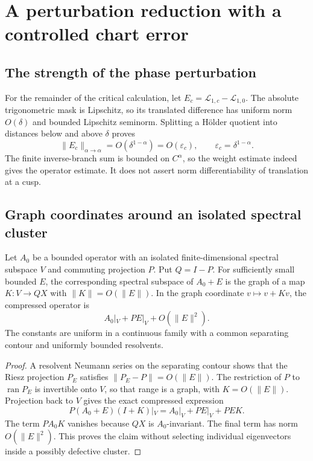 \documentclass[11pt,a4paper]{article}
\numberwithin{equation}{section}
\theoremstyle{definition}
\theoremstyle{remark}
\newcommand{\Lop}{\mathcal L}
\begin{document}
\section{A perturbation reduction with a controlled chart error}
\label{sec:compression}

\subsection{The strength of the phase perturbation}
For the remainder of the critical calculation, let
$E_c=\Lop_{1,c}-\Lop_{1,0}$. The absolute trigonometric mask is Lipschitz,
so its translated difference has uniform norm $O(\delta)$ and bounded
Lipschitz seminorm. Splitting a H\"older quotient into distances below
and above $\delta$ proves
\begin{equation}
 \|E_c\|_{\alpha\to\alpha}=O(\delta^{1-\alpha})
 =O(\varepsilon_c),\qquad \varepsilon_c=\delta^{1-\alpha}.
 \label{eq:translation-bound}
\end{equation}
The finite inverse-branch sum is bounded on $C^\alpha$, so the weight
estimate indeed gives the operator estimate. It does not assert norm
differentiability of translation at a cusp.

\subsection{Graph coordinates around an isolated spectral cluster}
\begin{lemma}
\label{lem:compression}
Let $A_0$ be a bounded operator with an isolated finite-dimensional
spectral subspace $V$ and commuting projection $P$. Put $Q=I-P$.
For sufficiently small bounded $E$, the corresponding spectral subspace
of $A_0+E$ is the graph of a map $K:V\to QX$ with
$\|K\|=O(\|E\|)$. In the graph coordinate $v\mapsto v+Kv$, the
compressed operator is
\begin{equation}
 A_0|_V+PE|_V+O(\|E\|^2).
 \label{eq:compression}
\end{equation}
The constants are uniform in a continuous family with a common separating
contour and uniformly bounded resolvents.
\end{lemma}
\begin{proof}
A resolvent Neumann series on the separating contour shows that the
Riesz projection $P_E$ satisfies $\|P_E-P\|=O(\|E\|)$.
The restriction of $P$ to $\operatorname{ran}P_E$ is invertible onto $V$,
so that range is a graph, with $K=O(\|E\|)$.
Projection back to $V$ gives the exact compressed expression
\[
 P(A_0+E)(I+K)|_V=A_0|_V+PE|_V+PEK.
\]
The term $PA_0K$ vanishes because $QX$ is $A_0$-invariant. The final term
has norm $O(\|E\|^2)$. This proves the claim without selecting individual
eigenvectors inside a possibly defective cluster.
\end{proof}
\end{document}
